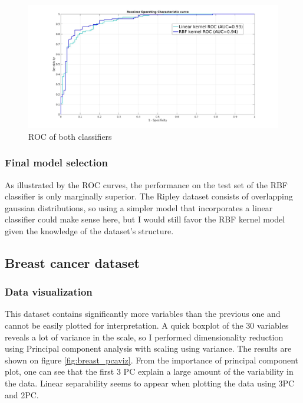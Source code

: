 \documentclass[11pt, a4paper]{article}
\begin{document}
\begin{figure}[H]
    \centering
    \includegraphics[scale=.20]{ripley_roc.jpg}
    \caption{ROC of both classifiers}
    \label{fig:ripley_rbf}
\end{figure}

\subsubsection{Final model selection}
As illustrated by the ROC curves, the performance on the test set of
the RBF classifier is only marginally superior. The Ripley dataset
consists of overlapping gaussian distributions, so using a simpler
model that incorporates a linear classifier could make sense here, but
I would still favor the RBF kernel model given the knowledge of the
dataset's structure.

\subsection{Breast cancer dataset}

\subsubsection{Data visualization}

This dataset contains significantly more variables than the previous
one and cannot be easily plotted for interpretation. A quick boxplot
of the 30 variables reveals a lot of variance in the scale, so I
performed dimensionality reduction using Principal component analysis
with scaling using variance. The results are shown on figure
\ref{fig:breast_pcaviz}. From the importance of principal component
plot, one can see that the first 3 PC explain a large amount of the
variability in the data. Linear separability seems to appear when
plotting the data using 3PC and 2PC. 
\end{document}
